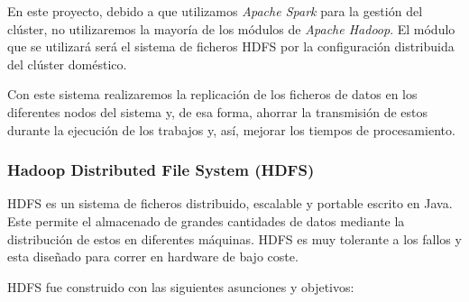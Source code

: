 En este proyecto, debido a que utilizamos \textit{Apache Spark} para la gestión del clúster, no utilizaremos la mayoría de los módulos de \textit{Apache Hadoop}. El módulo que se utilizará será el sistema de ficheros \gls{HDFS} por la configuración distribuida del clúster doméstico. 

Con este sistema realizaremos la replicación de los ficheros de datos en los diferentes nodos del sistema y, de esa forma, ahorrar la transmisión de estos durante la ejecución de los trabajos y, así, mejorar los tiempos de procesamiento.

\subsubsection{Hadoop Distributed File System (\gls{HDFS})}
\gls{HDFS} es un sistema de ficheros distribuido, escalable y portable escrito en Java. Este permite el almacenado de grandes cantidades de datos mediante la distribución de estos en diferentes máquinas. \gls{HDFS} es muy tolerante a los fallos y esta diseñado para correr en hardware de bajo coste. 

\gls{HDFS} fue construido con las siguientes asunciones y objetivos:

